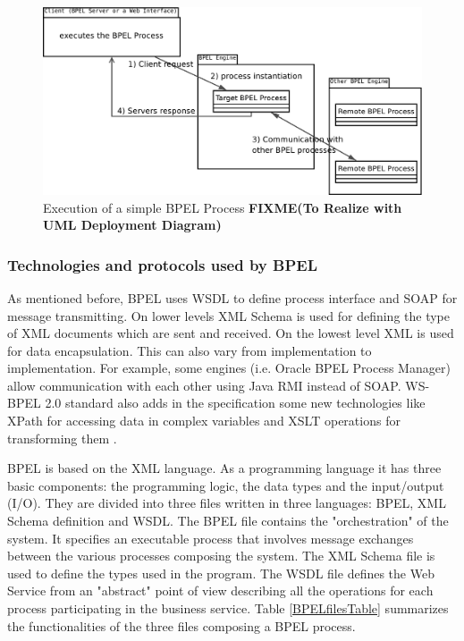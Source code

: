 \begin{figure}
\begin{center}
\includegraphics[width=125mm]{pictures/image-BPEL.pdf}
\caption{ Execution of a simple BPEL Process \textbf{FIXME(To Realize with UML Deployment Diagram)}}
\label{BPELprocess}
\end{center}
\end{figure}

\subsubsection{Technologies and protocols used by BPEL}
As mentioned before, BPEL uses WSDL to define process interface and SOAP for message transmitting. On lower levels XML Schema is used for defining the type of XML documents which are sent and received. On the lowest level XML is used for data encapsulation. This can also vary from implementation to implementation. For example, some engines (i.e. Oracle BPEL Process Manager) allow communication with each other using Java RMI instead of SOAP. WS-BPEL 2.0 standard also adds in the specification some new technologies like XPath for accessing data in complex variables and XSLT operations for transforming them \cite{OraBPELRMIInvocation}.


\label{BPELfiles}
BPEL is based on the XML language. As a programming language it has three basic components: the programming logic, the data types and the input/output (I/O). They are divided into three files written in three languages: BPEL, XML Schema definition and WSDL. 
The BPEL file contains the "orchestration" of the system. It specifies an executable process that involves message exchanges between the various processes composing the system. The XML Schema file is used to define the types used in the program. The WSDL file defines the Web Service from an "abstract" point of view describing all the operations for each process participating in the business service.
Table \ref{BPELfilesTable} summarizes the functionalities of the three files composing a BPEL process.

